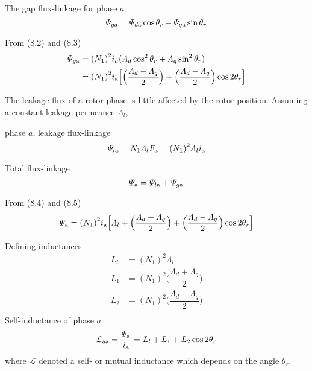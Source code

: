 \documentclass[a4paper,numbers=noenddot,12pt]{scrbook}
\begin{document}
        The gap flux-linkage for phase $a$
        \begin{equation}
            \varPsi_{g\textup{a}} = \varPsi_{d\textup{a}} \cos \theta_r - \varPsi_{q\textup{a}} \sin \theta_r
            \label{eq:Eq8.3}
        \end{equation}

        From (8.2) and (8.3)
        \begin{align}
            \varPsi_{g\textup{a}} & = {(N_1)}^2 i_a (\varLambda_d \cos^2 \theta_r + \varLambda_q \sin^2 \theta_r) \nonumber \\
            & = {(N_1)}^2 i_{\textup{a}} \Big[ \Big(\dfrac{\varLambda_d -\varLambda_q}{2}\Big) + \Big( \dfrac{\varLambda_d - \varLambda_q}{2} \Big) \cos 2\theta_r \Big]
            \label{eq:Eq8.4}
        \end{align}

        The leakage flux of a rotor phase is little affected by the rotor position. Assuming a constant leakage permeance $\varLambda_l$,

        phase $a$, leakage flux-linkage
        \begin{equation}
            \varPsi_{l\textup{a}} = N_1 \varLambda_l F_{\textup{a}} = {(N_1)}^2 \varLambda_l i_{\textup{a}} 
            \label{eq:Eq8.5}
        \end{equation}

        Total flux-linkage
        \begin{equation}
            \varPsi_{\textup{a}} = \varPsi_{l\textup{a}} + \varPsi_{g\textup{a}}
            \label{eq:Eq8.6}
        \end{equation}

        From (8.4) and (8.5)
        \begin{equation}
            \varPsi_{\textup{a}} = {(N_1)}^2 i_{\textup{a}} \Big[ \varLambda_l + \Big( \dfrac{\varLambda_d + \varLambda_q}{2}\Big) + \Big( \dfrac{\varLambda_d - \varLambda_q}{2}\Big) \cos2\theta_r\Big]
            \label{eq:Eq8.7}
        \end{equation}

        Defining inductances
        \begin{equation}
            \begin{aligned}
                L_l & ={(N_1)}^2 \varLambda_l \\
                L_1 & = {(N_1)}^2 \Big( \dfrac{\varLambda_d + \varLambda_q}{2}\Big) \\
                L_2 & = {(N_1)}^2 \Big( \dfrac{\varLambda_d - \varLambda_q}{2}\Big) \\
            \end{aligned}
            \label{eq:Eq8.8}
        \end{equation}
        Self-inductance of phase $a$
        \begin{equation}
            \mathcal{L}_{\textup{aa}} = \dfrac{\varPsi_{\textup{a}}}{i_{\textup{a}}} = L_l +L_1 +L_2 \cos 2\theta_r
            \label{eq:Eq8.9}
        \end{equation}
        where $\mathcal{L}$ denoted a self- or mutual inductance which depends on the angle $\theta_r$.
\end{document}
